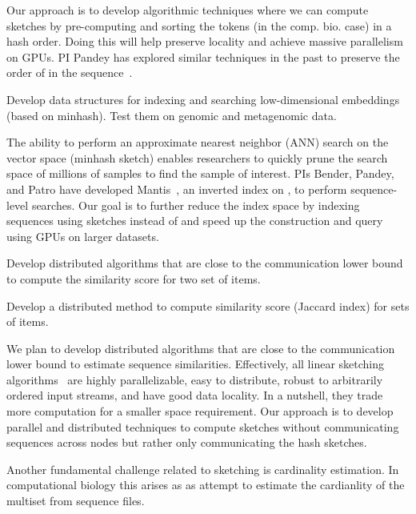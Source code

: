 Our approach is to develop algorithmic techniques where we can compute sketches by pre-computing and sorting the tokens (\kmers in the comp. bio. case) in a hash order. Doing this will help preserve locality and achieve massive parallelism on GPUs. PI Pandey has explored similar techniques in the past to preserve the order of \kmers in the sequence~\cite{Marais2019}.

\begin{rproblem}
Develop data structures for indexing and searching low-dimensional embeddings (based on minhash).  Test them on genomic and metagenomic data.
\end{rproblem}


The ability to perform an approximate nearest neighbor (ANN) search on the vector space (minhash sketch) enables researchers to quickly prune the search space of millions of samples to find the sample of interest. PIs  Bender, Pandey, and Patro have developed Mantis~\cite{PandeyAlBe18}, an inverted index on \kmers, to perform sequence-level searches. Our goal is to further reduce the index space by indexing sequences using sketches instead of \kmers and speed up the construction and query using GPUs on larger datasets.

\begin{rproblem}
Develop distributed algorithms that are close to the communication lower bound to  compute the similarity score for two set of items. 
\end{rproblem}

\begin{rproblem}
Develop a distributed method to compute similarity score (Jaccard index) for sets of items.
\end{rproblem}

We plan to develop distributed algorithms that are close to the communication lower bound to estimate sequence similarities. Effectively, all linear sketching algorithms~\cite{li2014sketchuniversal} are highly parallelizable, easy to distribute, robust to arbitrarily ordered input streams, and have good data locality. In a nutshell, they trade more computation for a smaller space requirement. Our approach is to develop parallel and distributed techniques to compute sketches without communicating sequences across nodes but rather only communicating the hash sketches.

Another fundamental challenge related to sketching is cardinality estimation. In computational biology this arises as as attempt to estimate the cardianlity of the \kmer multiset from sequence files. 

